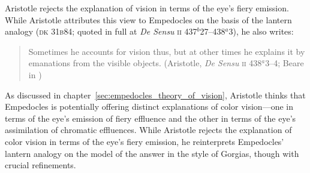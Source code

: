Aristotle rejects the explanation of vision in terms of the eye's fiery emission. While Aristotle attributes this view to Empedocles on the basis of the lantern analogy (\textsc{dk} 31\textsc{b}84; quoted in full at \emph{De Sensu} \textsc{ii} 437\( ^{b} \)27--438\( ^{a} \)3), he also writes:
\begin{quote}
	Sometimes he accounts for vision thus, but at other times he explains it by emanations from the visible objects. (Aristotle, \emph{De Sensu} \textsc{ii} 438\( ^{a} \)3--4; Beare in \citealt[5]{Barnes:1984uq})
\end{quote}
As discussed in chapter~\ref{sec:empedocles_theory_of_vision}, Aristotle thinks that Empedocles is potentially offering distinct explanations of color vision---one in terms of the eye's emission of fiery effluence and the other in terms of the eye's assimilation of chromatic effluences. While Aristotle rejects the explanation of color vision in terms of the eye's fiery emission, he reinterprets Empedocles' lantern analogy on the model of the answer in the style of Gorgias, though with crucial refinements.

